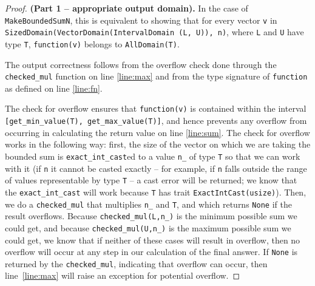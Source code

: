 \documentclass[11pt,a4paper]{article}
\theoremstyle{definition}
\newcommand{\connor}[1]{{ {\color{teal}{(connor)~#1}}}}
\begin{document}
\begin{proof}
    \textbf{(Part 1 -- appropriate output domain).} In the case of \texttt{MakeBoundedSumN}, this is equivalent to showing that for every vector \texttt{v} in \texttt{SizedDomain(VectorDomain(IntervalDomain (L, U)), n)}, where \texttt{L} and \texttt{U} have type \texttt{T}, \texttt{function(v)} belongs to \texttt{AllDomain(T)}.
    
    The output correctness follows from the overflow check done through the \texttt{checked\_mul} function on line \ref{line:max} and from the type signature of \texttt{function} as defined on line \ref{line:fn}.
    
    
    
    The check for overflow ensures that \texttt{function(v)} is contained within the interval \texttt{[get\_min\_value(T), get\_max\_value(T)]}, and hence prevents any overflow from occurring in calculating the return value on line \ref{line:sum}. The check for overflow works in the following way: first, the size of the vector on which we are taking the bounded sum is \texttt{exact\_int\_cast}ed to a value \texttt{n\_} of type \texttt{T} so that we can work with it (if \texttt{n} it cannot be casted exactly -- for example, if \texttt{n} falls outside the range of values representable by type \texttt{T} -- a cast error will be returned; we know that the \texttt{exact\_int\_cast} will work because \texttt{T} has trait \texttt{ExactIntCast(usize)}). Then, we do a \texttt{checked\_mul} that multiplies \texttt{n\_} and \texttt{T}, and which returns \texttt{None} if the result overflows. Because \texttt{checked\_mul(L,n\_)} is the minimum possible sum we could get, and because \texttt{checked\_mul(U,n\_)} is the maximum possible sum we could get, we know that if neither of these cases will result in overflow, then no overflow will occur at any step in our calculation of the final answer. If \texttt{None} is returned by the \texttt{checked\_mul}, indicating that overflow can occur, then line~\ref{line:max} will raise an exception for potential overflow.
    

\end{proof}
\end{document}
